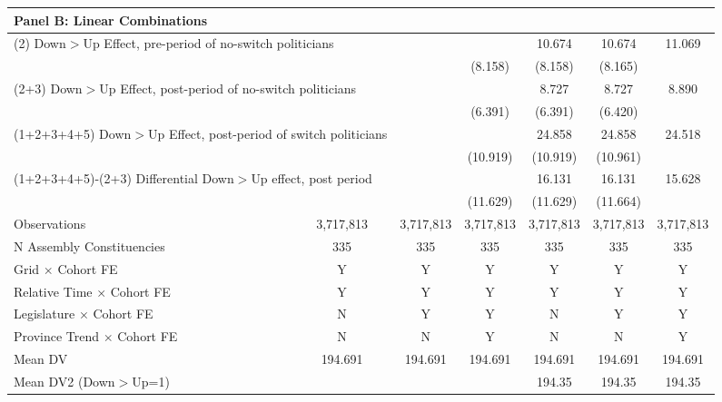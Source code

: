 {\begin{tabular}{l*{6}{c}}
\hline
\multicolumn{7}{l}{\textbf{Panel B: Linear Combinations}} \\ \hline
\multicolumn{2}{l}{(2) Down$>$Up Effect, pre-period of no-switch politicians}&            &            &      10.674&      10.674&      11.069\\
            &            &            &     (8.158)&     (8.158)&     (8.165)\\
\multicolumn{2}{l}{(2+3) Down$>$Up Effect, post-period of no-switch politicians}&            &            &       8.727&       8.727&       8.890\\
            &            &            &     (6.391)&     (6.391)&     (6.420)\\
\multicolumn{2}{l}{(1+2+3+4+5) Down$>$Up Effect, post-period of switch politicians}&            &            &24.858\sym{**}&24.858\sym{**}&24.518\sym{**}\\
            &            &            &    (10.919)&    (10.919)&    (10.961)\\
\multicolumn{2}{l}{(1+2+3+4+5)-(2+3) Differential Down$>$Up effect, post period}&            &            &      16.131&      16.131&      15.628\\
            &            &            &    (11.629)&    (11.629)&    (11.664)\\



\hline
Observations&   3,717,813&   3,717,813&   3,717,813&   3,717,813&   3,717,813&   3,717,813\\
N Assembly Constituencies&         335&         335&         335&         335&         335&         335\\
Grid $\times$ Cohort FE&           Y&           Y&           Y&           Y&           Y&           Y\\
Relative Time $\times$ Cohort FE&           Y&           Y&           Y&           Y&           Y&           Y\\
Legislature $\times$ Cohort FE&           N&           Y&           Y&           N&           Y&           Y\\
Province Trend $\times$ Cohort FE&           N&           N&           Y&           N&           N&           Y\\
Mean DV     &     194.691&     194.691&     194.691&     194.691&     194.691&     194.691\\
Mean DV2 (Down$>$Up=1)&            &            &            &      194.35&      194.35&      194.35\\
\hline
\end{tabular}
}
